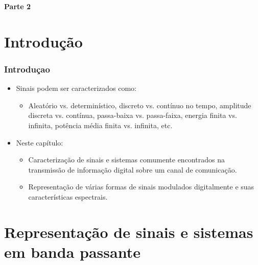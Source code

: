 
\begin{frame}
	\begin{block}{\centering\large\bfseries Parte 2}
		\centering\large\insertpart
	\end{block}
\end{frame}


\section{Introdução}

\begin{frame}
	\frametitle{Introduçao}

	\begin{itemize}
	 \item Sinais podem ser caracterizados como:
	  \begin{itemize}
	   \item Aleatório vs. determinístico, discreto vs. contínuo no tempo, amplitude discreta vs. contínua, passa-baixa vs. passa-faixa, energia finita vs. infinita, potência média finita vs. infinita, etc.
	  \end{itemize}
	  \item Neste capítulo:
	  \begin{itemize}
	   \item Caracterização de sinais e sistemas comumente encontrados na transmissão de informação digital sobre um canal de comunicação.
	   \item Representação de várias formas de sinais modulados digitalmente e suas características espectrais.
	  \end{itemize}
	\end{itemize}

\end{frame}


\section{Representação de sinais e sistemas em banda passante}

